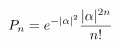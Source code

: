 \documentclass[preview]{standalone}
\begin{document}
\begin{align*}
\special{dvisvgm:raw <g id='unique000'>}P_n = e^{-|\alpha|^2} \frac{|\alpha|^{2n}}{n!}\special{dvisvgm:raw </g>}
\end{align*}
\end{document}
